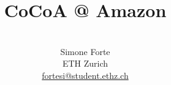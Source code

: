 \documentclass[11pt, a4paper, reqno, twoside]{scrartcl}
\begin{document}
\pagestyle{fancy}

\title{CoCoA @ Amazon}

\author{\\ Simone Forte\\
{\small ETH Zurich}\\
{\small \href{mailto:fortesi@student.ethz.ch}{fortesi@student.ethz.ch}}}
\date{}

\maketitle


%


{}

\end{document}
